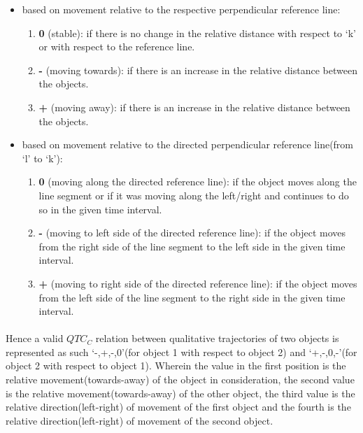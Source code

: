 	\begin{itemize}
		\item based on movement relative to the respective perpendicular reference line:
		
		\begin{enumerate}
			\item \textbf{0} (stable): if there is no change in the relative distance with respect to `k' or with respect to the reference line. 
			
			\item \textbf{-} (moving towards): if there is an increase in the relative distance between the objects.
			
			\item \textbf{+} (moving away): if there is an increase in the relative distance between the objects.
		\end{enumerate}
	
		\item  based on movement relative to the directed perpendicular reference line(from `l' to `k'):
		
		\begin{enumerate}
			\item \textbf{0} (moving along the directed reference line): if the object moves
			along the line segment or if it was moving along the left/right and continues to do so in the given time interval.
			
			\item \textbf{-} (moving to left side of the directed reference line): if the object moves from the right side of the line segment to the left side in the given time interval.
			
			\item \textbf{+} (moving to right side of the directed reference line): if the object moves from the left side of the line segment to the right side in the given time interval.
		\end{enumerate}
	
	\end{itemize}

	\paragraph{}Hence a valid $QTC_C$ relation between qualitative trajectories of two objects is represented as such `{-,+,-,0}'(for object 1 with respect to object 2) and `{+,-,0,-}'(for object 2 with respect to object 1). Wherein the value in the first position is the relative movement(towards-away) of the object in consideration, the second value is the relative movement(towards-away) of the other object, the third value is the relative direction(left-right) of movement of the first object and the fourth is the relative direction(left-right) of movement of the second object.
	
